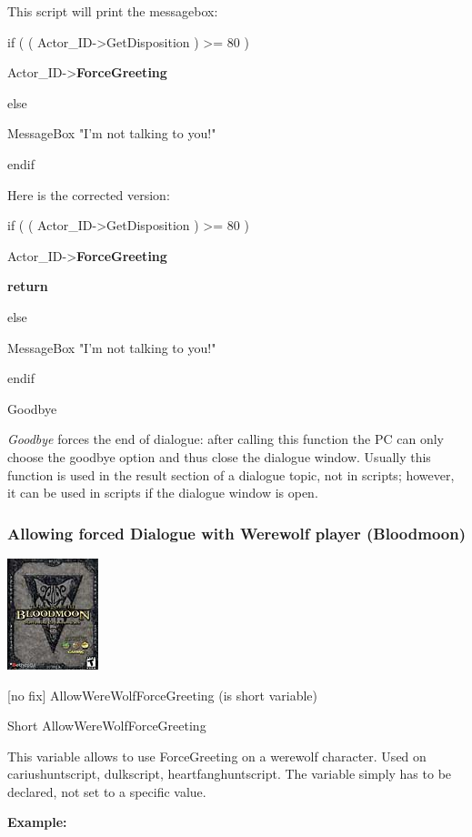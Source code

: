This script will print the messagebox:

if ( ( Actor\_ID-\textgreater GetDisposition ) \textgreater= 80 )

Actor\_ID-\textgreater{}\textbf{ForceGreeting}

else

MessageBox "I'm not talking to you!"

endif

Here is the corrected version:

if ( ( Actor\_ID-\textgreater GetDisposition ) \textgreater= 80 )

Actor\_ID-\textgreater{}\textbf{ForceGreeting~}

\textbf{return}

else

MessageBox "I'm not talking to you!"

endif

Goodbye

\emph{Goodbye} forces the end of dialogue: after calling this function
the PC can only choose the goodbye option and thus close the dialogue
window. Usually this function is used in the result section of a
dialogue topic, not in scripts; however, it can be used in scripts if
the dialogue window is open.

\hypertarget{allowing-forced-dialogue-with-werewolf-player-bloodmoon}{%
\subsubsection{Allowing forced Dialogue with Werewolf player
(Bloodmoon)}\label{allowing-forced-dialogue-with-werewolf-player-bloodmoon}}

\includegraphics{media/image7.png}

{[}no fix{]} AllowWereWolfForceGreeting (is short variable)

Short AllowWereWolfForceGreeting

This variable allows to use ForceGreeting on a werewolf character. Used
on cariushuntscript, dulkscript, heartfanghuntscript. The variable
simply has to be declared, not set to a specific value.

\textbf{Example:}

